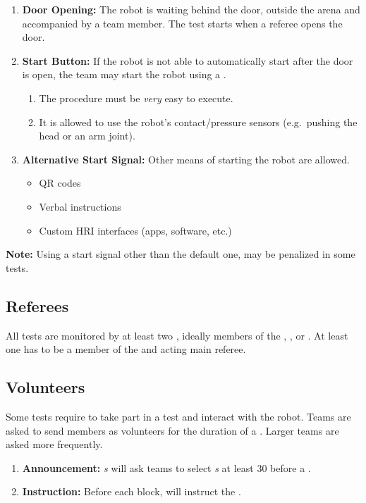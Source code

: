 \begin{enumerate}
	\item \textbf{Door Opening:} The robot is waiting behind the door, outside the arena and accompanied by a team member.
	The test starts when a referee opens the door.

	\item \textbf{Start Button:} If the robot is not able to automatically start after the door is open, the team may start the robot using a \StartButton{}.
	\begin{enumerate}[nosep]
		\item The procedure must be \emph{very} easy to execute.
		\item It is allowed to use the robot's contact/pressure sensors (e.g.~pushing the head or an arm joint).
	\end{enumerate}

	\item \textbf{Alternative Start Signal:} Other means of starting the robot are allowed.
	\begin{itemize}[nosep]
		\item QR codes
		\item Verbal instructions
		\item Custom HRI interfaces (apps, software, etc.)
	\end{itemize}
\end{enumerate}
\noindent\textbf{Note:} Using a start signal other than the default one, may be penalized in some tests.


\subsection{Referees}
\label{sec:rules:referees}
All tests are monitored by at least two \Referees{}, ideally members of the , , or . At least one has to be a member of the  and acting main referee.


\subsection{Volunteers}
\label{sec:rules:volunteers}
Some tests require \Volunteers{} to take part in a test and interact with the robot. Teams are asked to send members as volunteers for the duration of a \Testblock{}. Larger teams are asked more frequently. 
\begin{enumerate}
	\item \textbf{Announcement:} \Referee\textit{s} will ask teams to select \Volunteer\textit{s} at least \SI{30}{\min} before a \Testblock{}.
	\item \textbf{Instruction:} Before each block, \Referees{} will instruct the \Volunteers{}.
\end{enumerate}


